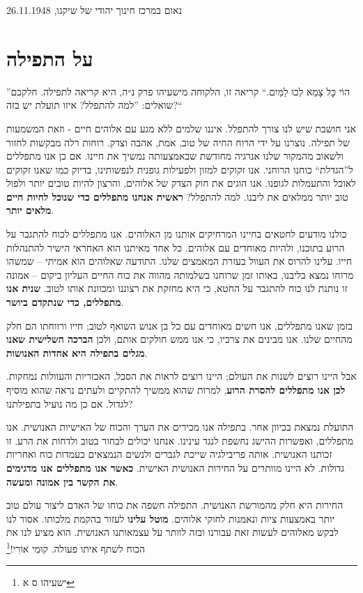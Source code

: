 \documentclass[14pt, article, extrafontsizes, twopage, a4paper]{memoir}
\newcommand{\attr}[1]{
{\raggedright\smaller#1}
}
\begin{document}
\attr{נאום במרכז חינוך יהודי של שיקגו, 26.11.1948}

\chapter{על התפילה}

”הוֹי כׇּל צָמֵא לְכוּ לַמַּיִם.“
קריאה זו, הלקוחה מישעיהו פרק נ״ה, היא קריאה לתפילה. חלקכם שואלים: ”למה להתפלל? איזו תועלת יש בזה?“

אני חושבת שיש לנו צורך להתפלל. איננו שלמים ללא מגע עם אלוהים חיים - וזאת המשמעות של תפילה. נוצרנו על ידי הרוח החיה של טוב, אמת, אהבה וצדק. רוחות רלה מבקשות לחזור ולשאוב מהמקור שלנו אנרגיה מחודשת שבאמצעותה נמשיך את חיינו. אם כן אנו מתפללים ל”הגדלת“ כוחנו הרוחני. אנו זקוקים למזון ולפעילות גופנית לנפשותינו, בדיוק כמו שאנו זקוקים לאוכל והתעמלות לגופנו. אנו הוגים את חוק הצדק של אלוהים, והרצון להיות טובים יותר ולפול טוב יותר ממלאים את ליבנו. למה להתפלל? \textbf{ראשית אנחנו מתפללים כדי שנוכל לחיות חיים מלאים יותר}.

כולנו מודעים לחטאים בחיינו המרחיקים אותנו מן האלוהים. אנו מתפללים לכוח להתגבר על הרוע בתוכנו, ולהיות מאוחדים עם אלוהים. כל אחד מאיתנו הוא האחראי הישיר להתנהלות חייו. עלינו להרוס את העוול בעזרת המאמצים שלנו. התודעה שאלוהים הוא אמיתי -- שמשהו מרוחו נמצא בליבנו, באותו זמן שרוחנו בשלמותה מהווה את כוח החיים העליון ביקום – אמונה זו נותנת לנו כוח להתגבר על החטא, כי היא מחזקת את רצוננו ומכוונת אותו לטוב. \textbf{שנית אנו מתפללים, כדי שנתקדם ביושר}.

בזמן שאנו מתפללים, אנו חשים מאוחדים עם כל בן אנוש השואף לטוב; חייו ורווחתו הם חלק מהחיים שלנו. אנו מבינים את צרכיו, כי אנו ממש חולקים אותם, ולכן \textbf{הברכה השלישית שאנו מגלים בתפילה היא אחדות האנושות}.

אבל היינו רוצים לשנות את העולם; היינו רוצים לראות את הסבל, האכזריות והעוולות נמחקות. \textbf{לכן אנו מתפללים להסרת הרוע}, למרות שהוא ממשיך להתקיים ולעתים נראה שהוא מוסיף לגדול. אם כן מה נועיל בתפילתנו?

התועלת נמצאת בכיוון אחר. בתפילה אנו מכירים את הערך והכוח של האישיות האנושית. אנו מתפללים, ואפשרות ההישג נחשפת לנגד עינינו. אנחנו יכולים לבחור בטוב ולדחות את הרע. זו זכותנו האנושית. אותה פריבילגיה שייכת לגברים ולנשים הנמצאים בעמדות כוח ואחריות גדולות. לא היינו מוותרים על החירות האנושית האישית. \textbf{כאשר אנו מתפללים אנו מדגימים את הקשר בין אמונה ומעשה}.

החירות היא חלק מהמורשת האנושית. התפילה חשפה את כוחו של האדם ליצור עולם טוב יותר באמצעות ציות ונאמנות לחוקי אלוהים. \textbf{מוטל עלינו} לעזור בהקמת מלכותו. אסור לנו לבקש מאלוהים לעשות זאת עבורנו ובזה לוותר על עצמאותנו האנושית. הוא מציע לנו את הכוח לשתף איתו פעולה. קוּמִי אוֹרִי!\footnote{ישעיהו ס א}
\end{document}
